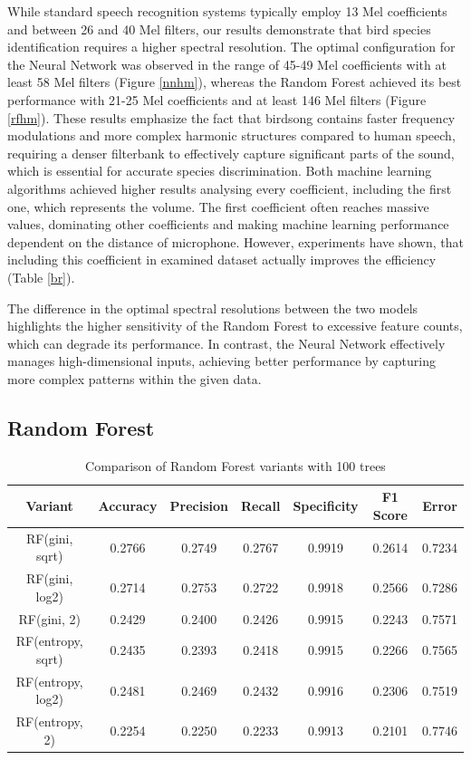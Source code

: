 \documentclass[
onecolumn,
]{ceurart}
\begin{document}
	
	While standard speech recognition systems typically employ 13 Mel coefficients and between 26 and 40 Mel filters\cite{joshi2014matlab,mahmood2021speech,al2023mel}, our results demonstrate that bird species identification requires a higher spectral resolution. The optimal configuration for the Neural Network was observed in the range of 45-49 Mel coefficients with at least 58 Mel filters (Figure \ref{nnhm}), whereas the Random Forest achieved its best performance with 21-25 Mel coefficients and at least 146 Mel filters (Figure \ref{rfhm}). These results emphasize the fact that birdsong contains faster frequency modulations and more complex harmonic structures compared to human speech, requiring a denser filterbank to effectively capture significant parts of the sound, which is essential for accurate species discrimination. Both machine learning algorithms achieved higher results analysing every coefficient, including the first one, which represents the volume. The first coefficient often reaches massive values, dominating other coefficients and making machine learning performance dependent on the distance of microphone. However, experiments have shown, that including this coefficient in examined dataset actually improves the efficiency (Table \ref{br}).
	
	
	The difference in the optimal spectral resolutions between the two models highlights the higher sensitivity of the Random Forest to excessive feature counts, which can degrade its performance. In contrast, the Neural Network effectively manages high-dimensional inputs, achieving better performance by capturing more complex patterns within the given data.
	
  \subsection{Random Forest}
	
	\begin{table}
		\centering
		\caption{Comparison of Random Forest variants with 100 trees}
		\begin{tabular}{|c|c|c|c|c|c|c|}
			\hline
			Variant & Accuracy & Precision & Recall & Specificity & F1 Score & Error \\\hline
			RF(gini, sqrt) & 0.2766 & 0.2749 & 0.2767 & 0.9919 & 0.2614 & 0.7234 \\\hline
			RF(gini, log2) & 0.2714 & 0.2753 & 0.2722 & 0.9918 & 0.2566 & 0.7286 \\\hline
			RF(gini, 2) & 0.2429 & 0.2400 & 0.2426 & 0.9915 & 0.2243 & 0.7571 \\\hline
			RF(entropy, sqrt) & 0.2435 & 0.2393 & 0.2418 & 0.9915 & 0.2266 & 0.7565 \\\hline
			RF(entropy, log2) & 0.2481 & 0.2469 & 0.2432 & 0.9916 & 0.2306 & 0.7519 \\\hline
			RF(entropy, 2) & 0.2254 & 0.2250 & 0.2233 & 0.9913 & 0.2101 & 0.7746 \\\hline
		\end{tabular}
		\label{rfc}
	\end{table}
	
\end{document}
